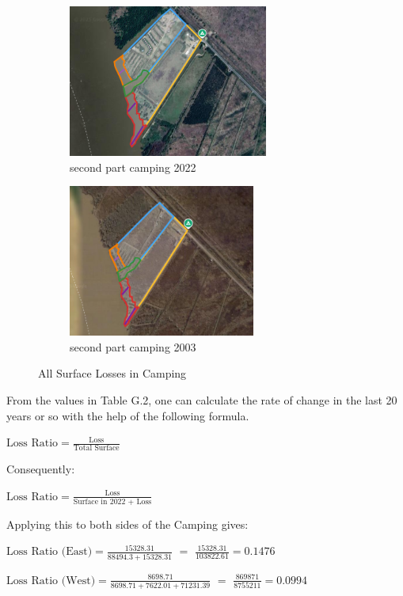 \begin{figure}[H]
    \begin{subfigure}[b]{0.48\textwidth}
        \includegraphics[width=\linewidth, height =5cm]{figures/appendix-g/delen2022.png}
        \caption{second part camping 2022}
        \label{fig:second}
    \end{subfigure}
    \hfill
    \begin{subfigure}[b]{0.48\textwidth}
        \includegraphics[width=\linewidth, height =5cm]{figures/appendix-g/delen2003.png}
        \caption{second part camping 2003}
        \label{fig:second}
    \end{subfigure}

    \caption{All Surface Losses in Camping }
    \label{fig:All Surface Losses Camping appendix}
\end{figure}

From the values in Table G.2, one can calculate the rate of change in the last 20 years or so with the help of the following formula.

$\text{Loss Ratio} = \frac{\text{Loss}}{\text{Total Surface}}$

Consequently:

$\text{Loss Ratio} = \frac{\text{Loss}}{\text{Surface in 2022 + Loss}}$

Applying this to both sides of the Camping gives:

$\text{Loss Ratio (East)} = \frac{15328.31}{88494.3 + 15328.31}$
$=$ $\frac{15328.31}{103822.61} = 0.1476$ 

$\text{Loss Ratio (West)} = \frac{8698.71}{8698.71 +7622.01 + 71231.39}$ $=$
$\frac{869871}{8755211} = 0.0994 $ 

